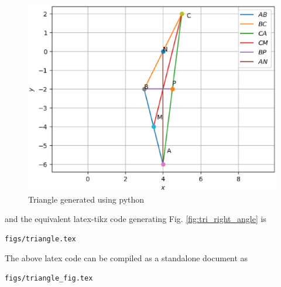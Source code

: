 \begin{enumerate}[label=\thesection.\arabic*.,ref=\thesection.\theenumi]
\begin{figure}[!ht]
\centering
\includegraphics[width=\columnwidth]{./figs/triangle.eps}
\caption{Triangle generated using python}
\label{fig:tri_sss_py}
\end{figure}

%
and the equivalent latex-tikz code generating Fig. \ref{fig:tri_right_angle} is 
\begin{lstlisting}
figs/triangle.tex
\end{lstlisting}
%
The above latex code can be compiled as a standalone document as
\begin{lstlisting}
figs/triangle_fig.tex
\end{lstlisting}

%

%

%
%

\end{enumerate}


